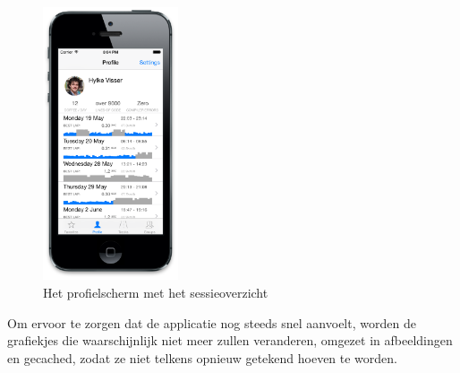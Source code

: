 \begin{figure}
  \begin{center}
    \includegraphics[width=4cm]{style/images/screenshots/I-03-Home}
  \end{center}
  \caption{Het profielscherm met het sessieoverzicht}
  \label{fig:profiel-scherm}
\end{figure}

Om ervoor te zorgen dat de applicatie nog steeds snel aanvoelt, worden de grafiekjes die waarschijnlijk niet meer zullen veranderen, omgezet in afbeeldingen en gecached, zodat ze niet telkens opnieuw getekend hoeven te worden.
